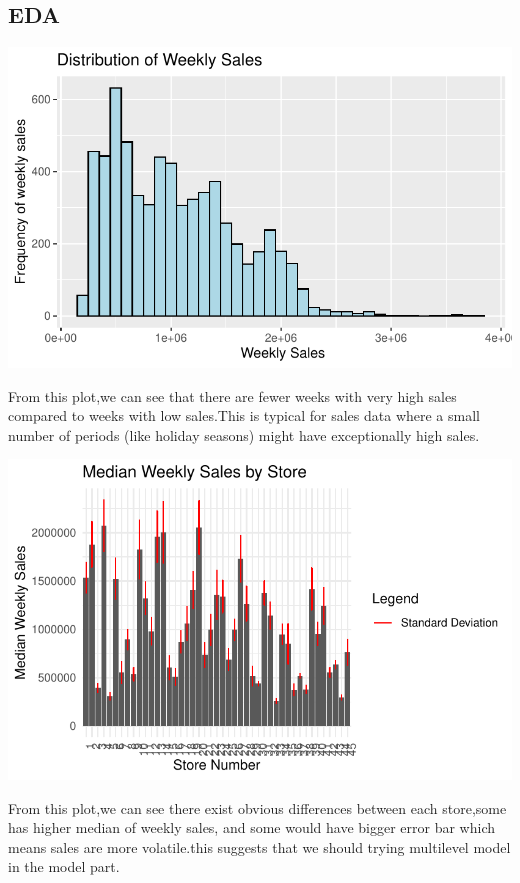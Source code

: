 \documentclass[
  letterpaper,
  DIV=11,
  numbers=noendperiod]{scrartcl}
\begin{document}
\hypertarget{eda}{%
\subsection{EDA}\label{eda}}

\includegraphics{678final_files/figure-pdf/unnamed-chunk-4-1.pdf}

From this plot,we can see that there are fewer weeks with very high
sales compared to weeks with low sales.This is typical for sales data
where a small number of periods (like holiday seasons) might have
exceptionally high sales.

\includegraphics{678final_files/figure-pdf/unnamed-chunk-5-1.pdf}

From this plot,we can see there exist obvious differences between each
store,some has higher median of weekly sales, and some would have bigger
error bar which means sales are more volatile.this suggests that we
should trying multilevel model in the model part.
\end{document}
